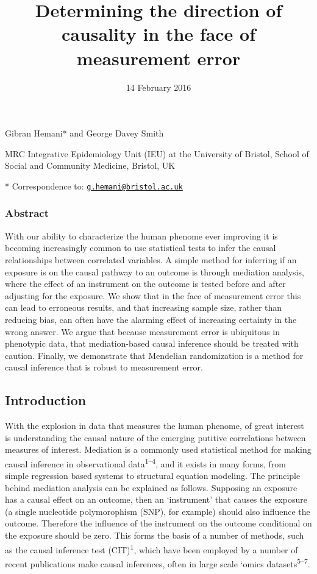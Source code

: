 \documentclass[]{article}
\title{Determining the direction of causality in the face of measurement error}
\author{}
\date{14 February 2016}
\begin{document}
\maketitle


Gibran Hemani* and George Davey Smith

MRC Integrative Epidemiology Unit (IEU) at the University of Bristol,
School of Social and Community Medicine, Bristol, UK

* Correspondence to:
\href{mailto:g.hemani@bristol.ac.uk}{\nolinkurl{g.hemani@bristol.ac.uk}}

\subsubsection{Abstract}\label{abstract}

With our ability to characterize the human phenome ever improving it is
becoming increasingly common to use statistical tests to infer the
causal relationships between correlated variables. A simple method for
inferring if an exposure is on the causal pathway to an outcome is
through mediation analysis, where the effect of an instrument on the
outcome is tested before and after adjusting for the exposure. We show
that in the face of measurement error this can lead to erroneous
results, and that increasing sample size, rather than reducing bias, can
often have the alarming effect of increasing certainty in the wrong
answer. We argue that because measurement error is ubiquitous in
phenotypic data, that mediation-based causal inference should be treated
with caution. Finally, we demonstrate that Mendelian randomization is a
method for causal inference that is robust to measurement error.

\subsection{Introduction}\label{introduction}

With the explosion in data that measures the human phenome, of great
interest is understanding the causal nature of the emerging putitive
correlations between measures of interest. Mediation is a commonly used
statistical method for making causal inference in observational
data\textsuperscript{1--4}, and it exists in many forms, from simple
regression based systems to structural equation modeling. The principle
behind mediation analysis can be explained as follows. Supposing an
exposure has a causal effect on an outcome, then an `instrument' that
causes the exposure (a single nucleotide polymorophism (SNP), for
example) should also influence the outcome. Therefore the influence of
the instrument on the outcome conditional on the exposure should be
zero. This forms the basis of a number of methods, such as the causal
inference test (CIT)\textsuperscript{1}, which have been employed by a
number of recent publications make causal inferences, often in large
scale `omics datasets\textsuperscript{5--7}.
\end{document}
